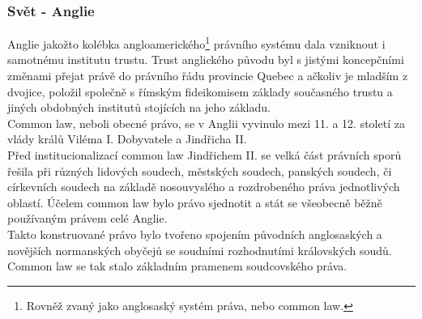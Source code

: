 \documentclass{article}
\begin{document}
\subsubsection{Svět - Anglie}

Anglie jakožto kolébka angloamerického\footnote{Rovněž zvaný jako anglosaský systém práva, nebo common law.} právního systému dala vzniknout i samotnému institutu trustu. Trust anglického původu byl s jistými koncepčními změnami přejat právě do právního řádu provincie Quebec a ačkoliv je mladším z dvojice, položil společně s římským fideikomisem základy současného trustu a jiných obdobných institutů stojících na jeho základu.\\




Common law, neboli obecné právo, se v Anglii vyvinulo mezi 11. a 12. století za vlády králů Viléma I. Dobyvatele a Jindřicha II.\\

Před institucionalizací common law Jindřichem II. se velká část právních sporů řešila při různých lidových soudech, městských soudech, panských soudech, či církevních soudech na základě nosouvyslého a rozdrobeného práva jednotlivých oblastí. Účelem common law bylo právo sjednotit a stát se všeobecně běžně používaným právem celé Anglie.\\

Takto konstruované právo bylo tvořeno spojením původních anglosaských a novějších normanských obyčejů se soudními rozhodnutími královských soudů. Common law se tak stalo základním pramenem soudcovského práva.\\
\end{document}
